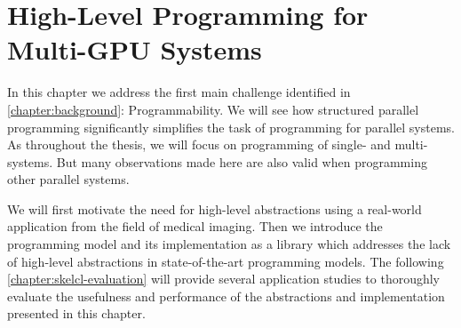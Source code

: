 
\chapter{High-Level Programming for Multi-GPU Systems}

\label{chapter:skelcl}

In this chapter we address the first main challenge identified in \autoref{chapter:background}: Programmability.
We will see how structured parallel programming significantly simplifies the task of programming for parallel systems.
As throughout the thesis, we will focus on programming of single- and multi-\GPU systems.
But many observations made here are also valid when programming other parallel systems.

We will first motivate the need for high-level abstractions using a real-world \OpenCL application from the field of medical imaging.
Then we introduce the \emph{\SkelCL} programming model and its implementation as a \Cpp library which addresses the lack of high-level abstractions in state-of-the-art \GPU programming models.
The following \autoref{chapter:skelcl-evaluation} will provide several application studies to thoroughly evaluate the usefulness and performance of the abstractions and implementation presented in this chapter.









